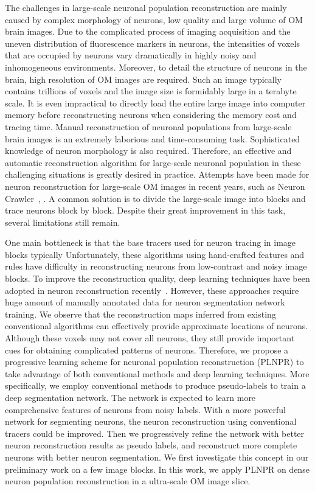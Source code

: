 The challenges in large-scale neuronal population reconstruction are mainly caused by complex morphology of neurons, low quality and large volume of OM brain images.
Due to the complicated process of imaging acquisition and the uneven distribution of fluorescence markers in neurons, the intensities of voxels that are occupied by neurons vary dramatically in highly noisy and inhomogeneous environments.
Moreover, to detail the structure of neurons in the brain, high resolution of OM images are required. Such an image typically contains trillions of voxels and the image size is formidably large in a terabyte scale. It is even impractical to directly load the entire large image into computer memory before reconstructing neurons when considering the memory cost and tracing time.
Manual reconstruction of neuronal populations from large-scale brain images is an extremely laborious and time-consuming task.
Sophisticated knowledge of neuron morphology is also required.
%
Therefore, an effective and automatic reconstruction algorithm for large-scale neuronal population in these challenging situations is greatly desired in practice.
Attempts have been made for neuron reconstruction for large-scale OM images in recent years, such as Neuron Crawler~\cite{Zhou2015}, .
A common solution is to divide the large-scale image into blocks and trace neurons block by block.
Despite their great improvement in this task, several limitations still remain.


One main bottleneck is that the base tracers used for neuron tracing in image blocks typically 
Unfortunately, these algorithms using hand-crafted features and rules have difficulty in reconstructing neurons from low-contrast and noisy image blocks.
To improve the reconstruction quality, deep learning techniques have been adopted in neuron reconstruction recently~\cite{Xu2016, Li2017, Zhou2018}. 
However, these approaches require huge amount of manually annotated data for neuron segmentation network training.
%
We observe that the reconstruction maps inferred from existing conventional algorithms can effectively provide approximate locations of neurons. 
Although these voxels may not cover all neurons, they still provide important cues for obtaining complicated patterns of neurons.
Therefore, we propose a progressive learning scheme for neuronal population reconstruction (PLNPR) to take advantage of both conventional methods and deep learning techniques.
More specifically, we employ conventional methods to produce pseudo-labels to train a deep segmentation network. 
The network is expected to learn more comprehensive features of neurons from noisy labels. 
With a more powerful network for segmenting neurons, the neuron reconstruction using conventional tracers could be improved. 
Then we progressively refine the network with better neuron reconstruction results as pseudo labels, and reconstruct more complete neurons with better neuron segmentation.
We first investigate this concept in our preliminary work \cite{Zhao2019} on a few image blocks. 
In this work, we apply PLNPR on dense neuron population reconstruction in a ultra-scale OM image slice. 

